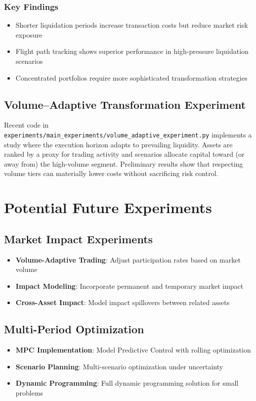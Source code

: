 \documentclass[11pt, letterpaper]{article}
\begin{document}
\subsubsection{Key Findings}
\begin{itemize}
    \item Shorter liquidation periods increase transaction costs but reduce market risk exposure
    \item Flight path tracking shows superior performance in high-pressure liquidation scenarios
    \item Concentrated portfolios require more sophisticated transformation strategies
\end{itemize}

\subsection{Volume--Adaptive Transformation Experiment}
Recent code in \texttt{experiments/main\_experiments/volume\_adaptive\_experiment.py}
implements a study where the execution horizon adapts to prevailing liquidity.
Assets are ranked by a proxy for trading activity and scenarios allocate
capital toward (or away from) the high-volume segment.  Preliminary results
show that respecting volume tiers can materially lower costs without
sacrificing risk control.

\section{Potential Future Experiments}

\subsection{Market Impact Experiments}
\begin{itemize}
    \item \textbf{Volume-Adaptive Trading}: Adjust participation rates based on market volume
    \item \textbf{Impact Modeling}: Incorporate permanent and temporary market impact
    \item \textbf{Cross-Asset Impact}: Model impact spillovers between related assets
\end{itemize}

\subsection{Multi-Period Optimization}
\begin{itemize}
    \item \textbf{MPC Implementation}: Model Predictive Control with rolling optimization
    \item \textbf{Scenario Planning}: Multi-scenario optimization under uncertainty
    \item \textbf{Dynamic Programming}: Full dynamic programming solution for small problems
\end{itemize}
\end{document}
